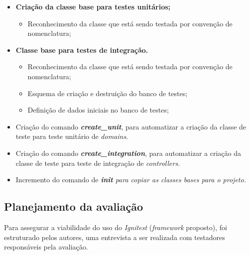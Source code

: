       
    \begin{itemize}
      
        \item \textbf{Criação da classe base para testes unitários;}
    
            \begin{itemize}
              \item Reconhecimento da classe que está sendo testada por convenção de nomenclatura;

            \end{itemize}
     
        \item \textbf{Classe base para testes de integração.}
    
            \begin{itemize}
              \item Reconhecimento da classe que está sendo testada por convenção de nomenclatura;
              \item Esquema de criação e destruição do banco de testes;
              \item Definição de dados iniciais no banco de testes;
            
            \end{itemize}
    
        \item Criação do comando \textit{\textbf{create\_unit}}, para automatizar a criação da classe de teste para teste unitário de \textit{domains}.
        
        \item Criação do comando \textit{\textbf{create\_integration}}, para automatizar a criação da classe de teste para teste de integração de \textit{controllers}.
      
        \item Incremento do comando de \textit{\textbf{init} para copiar as classes bases para o projeto.}

    \end{itemize}

    \subsection{Planejamento da avaliação}

     Para assegurar a viabilidade do uso do \textit{Ignitest} (\textit{framework} proposto), foi estruturado pelos autores, uma entrevista a ser realizada com testadores responsáveis pela avaliação.
    
